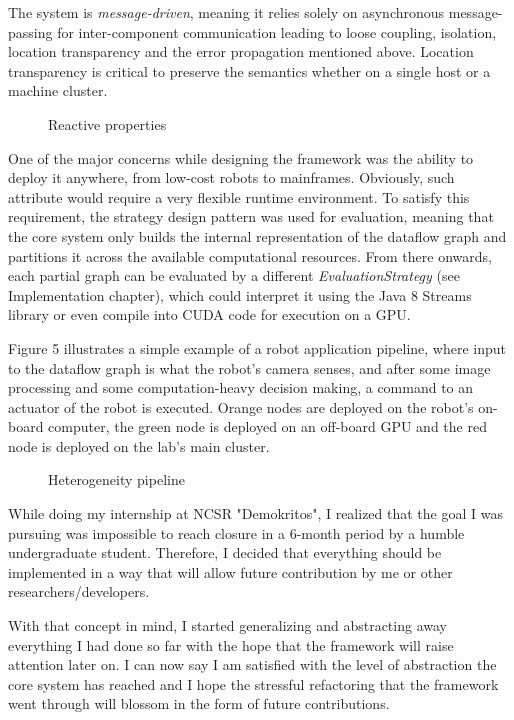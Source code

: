 \documentclass{dithesis}
\begin{document}
The system is \textit{message-driven}, meaning it relies solely on asynchronous message-passing for inter-component communication leading to loose coupling, isolation, location transparency and the error propagation mentioned above. Location transparency is critical to preserve the semantics whether on a single host or a machine cluster. 

\begin{figure}[h!] 
	\centering    
  	 
  	\caption{Reactive properties}
\end{figure}


One of the major concerns while designing the framework was the ability to deploy it anywhere, from low-cost robots to mainframes. Obviously, such attribute would require a very flexible runtime environment. To satisfy this requirement, the strategy design pattern was used for evaluation, meaning that the core system only builds the internal representation of the dataflow graph and partitions it across the available computational resources. From there onwards, each partial graph can be evaluated by a different \textit{EvaluationStrategy} (see Implementation chapter), which could interpret it using the Java 8 Streams library or even compile into CUDA code for execution on a GPU.

Figure 5 illustrates a simple example of a robot application pipeline, where input to the dataflow graph is what the robot's camera senses, and after some image processing and some computation-heavy decision making, a command to an actuator of the robot is executed. Orange nodes are deployed on the robot's on-board computer, the green node is deployed on an off-board GPU and the red node is deployed on the lab's main cluster.

\begin{figure}[h!] 
	\centering
 	 
  	\caption{Heterogeneity pipeline}
\end{figure}


While doing my internship at NCSR "Demokritos", I realized that the goal I was pursuing was impossible to reach closure in a 6-month period by a humble undergraduate student. Therefore, I decided that everything should be implemented in a way that will allow future contribution by me or other researchers/developers. 

With that concept in mind, I started generalizing and abstracting away everything I had done so far with the hope that the framework will raise attention later on. I can now say I am satisfied with the level of abstraction the core system has reached and I hope the stressful refactoring that the framework went through will blossom in the form of future contributions.
\end{document}
